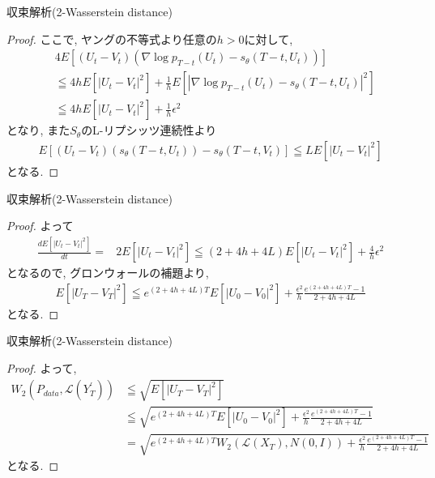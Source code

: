 \documentclass[dvipdfmx,11pt]{beamer}
\theoremstyle{plain}
\theoremstyle{定義}
\begin{document}
  \begin{frame}{収束解析(2-Wasserstein distance)}
    \begin{proof}
      ここで, ヤングの不等式より任意の$h>0$に対して, 
      \begin{align*}
        &4E[(U_t-V_t)(\nabla\log p_{T-t}(U_t)-s_\theta(T-t,U_t))]\\
        &\leqq 4hE[|U_t-V_t|^2]+\frac{1}{h}E[|\nabla\log p_{T-t}(U_t)-s_\theta(T-t,U_t)|^2]\\
        &\leqq 4hE[|U_t-V_t|^2]+\frac{1}{h}\epsilon^2
      \end{align*}
      となり, また$S_\theta$のL-リプシッツ連続性より
      \begin{align*}
        E[(U_t-V_t)(s_\theta(T-t,U_t))-s_\theta(T-t,V_t)]\leqq LE[|U_t-V_t|^2]
      \end{align*}
      となる.
    \end{proof}
  \end{frame}
  \begin{frame}{収束解析(2-Wasserstein distance)}
    \begin{proof}
      よって
      \begin{align*}
        \frac{dE[|U_t-V_t|^2]}{dt}=&2E[|U_t-V_t|^2]\leqq (2+4h+4L)E[|U_t-V_t|^2]+\frac{4}{h}\epsilon^2
      \end{align*}
      となるので, グロンウォールの補題より,
      \begin{align*}
        E[|U_T-V_T|^2]\leqq e^{(2+4h+4L)T}E[|U_0-V_0|^2]+\frac{\epsilon^2}{h}\frac{e^{(2+4h+4L)T}-1}{2+4h+4L}
      \end{align*}
      となる.
    \end{proof}
  \end{frame}
  \begin{frame}{収束解析(2-Wasserstein distance)}
    \begin{proof}
      よって, 
      \begin{align*}
        W_2(P_{data},\mathcal{L}(Y^{\prime}_T))&\leqq\sqrt{E[|U_T-V_T|^2]}\\
        &\leqq \sqrt{e^{(2+4h+4L)T}E[|U_0-V_0|^2]+\frac{\epsilon^2}{h}\frac{e^{(2+4h+4L)T}-1}{2+4h+4L}}\\
        &=\sqrt{e^{(2+4h+4L)T}W_2(\mathcal{L}(X_T),N(0,I))+\frac{\epsilon^2}{h}\frac{e^{(2+4h+4L)T}-1}{2+4h+4L}}
      \end{align*}
      となる.
    \end{proof}
  \end{frame}
\end{document}
